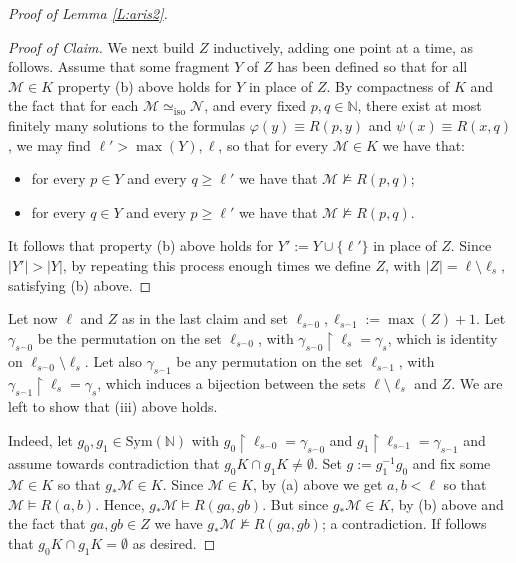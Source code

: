 \documentclass[11pt]{amsart}
\theoremstyle{plain}
\theoremstyle{definition}
\begin{document}
\begin{proof}[Proof of Lemma \ref{L:aris2}]
\begin{proof}[Proof of Claim]
We next build $Z$ inductively,  adding one point at a time, as follows. Assume that some fragment $Y$ of $Z$ has been defined so that for all
$\mathcal{M}\in K$ property (b) above holds for $Y$ in place of $Z$.
By compactness of $K$ and the fact that for each  $\mathcal{M}\simeq_{\mathrm{iso}}\mathcal{N}$, and every fixed $p,q\in\mathbb{N}$, there exist at most finitely many solutions to the formulas $\varphi(y) \equiv R(p,y)$ and $\psi(x) \equiv R(x,q)$,  we may find  $\ell'> \max(Y), \ell$, so that for every  $\mathcal{M}\in K$ we have that:
\begin{itemize}
    \item[(i)]    for every $p\in Y$ and every $q\geq \ell'$ we have that  $\mathcal{M}\not\models R(p,q)$;
    \item[(ii)]   for every $q\in Y$ and every $p\geq \ell'$ we have that  $\mathcal{M}\not\models R(p,q)$.
\end{itemize}
It follows that  property (b) above holds for $Y':=Y\cup\{\ell'\}$ in place of $Z$. Since $|Y'|>|Y|$, by repeating this process enough times we define $Z$, with $|Z|=\ell\setminus \ell_s$, satisfying  (b) above.
\end{proof}

Let now $\ell$ and $Z$ as in the last claim and set $\ell_{s^{\frown}0}, \ell_{s^{\frown}1}:=\max(Z)+1$. Let $\gamma_{s^{\frown}0}$ be the permutation on the set $\ell_{s^{\frown}0}$, with  $\gamma_{s^{\frown}0}\upharpoonright \ell_s= \gamma_{s}$, which is identity on $\ell_{s^{\frown}0}\setminus\ell_s$.
Let also $\gamma_{s^{\frown}1}$ be any permutation on the set $\ell_{s^{\frown}1}$, with  $\gamma_{s^{\frown}1}\upharpoonright \ell_s= \gamma_{s}$, which induces a bijection between the sets  $\ell\setminus \ell_s$ and $Z$.
 We are left to show that  (iii) above holds.



Indeed, let  $g_0,g_1\in \mathrm{Sym}(\mathbb{N})$ with $g_0\upharpoonright \ell_{s^{\frown}0}=\gamma_{s^{\frown}0}$ and $g_1\upharpoonright \ell_{s^{\frown}1}=\gamma_{s^{\frown}1}$ and assume towards contradiction that $g_0K\cap g_1 K\neq\emptyset$. Set $g:=g^{-1}_1g_0$ and fix some $\mathcal{M}\in K$ so that $g_*\mathcal{M}\in K$. Since $\mathcal{M}\in K$, by (a) above we get $a,b<\ell$  so that $\mathcal{M}\models R(a,b)$. Hence,  $g_*\mathcal{M}\models R(ga,gb)$.
But since $g_*\mathcal{M}\in K$,  by (b) above and the fact that  $ga, gb \in Z$ we have $g_*\mathcal{M}\not\models R(ga,gb)$; a contradiction. If follows that $g_0K\cap g_1 K=\emptyset$ as desired.





\end{proof}
\end{document}
